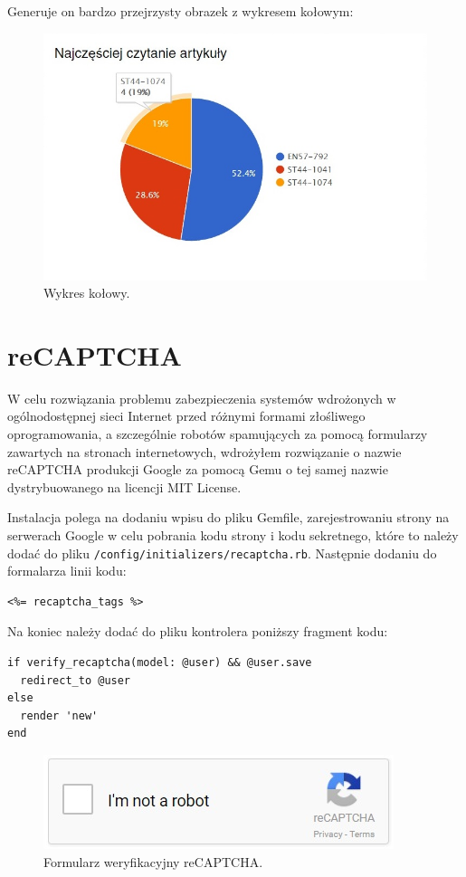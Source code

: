 \documentclass[openright]{xmgr}
\begin{document}
\newpage

Generuje on bardzo przejrzysty obrazek z wykresem kołowym:
\begin{figure}[!tbh]
\centering
\includegraphics[width=.5\linewidth]{fig/chartkick}
\caption{Wykres kołowy.}
\end{figure}

\section{reCAPTCHA}

W celu rozwiązania problemu zabezpieczenia systemów wdrożonych w ogólnodostępnej sieci Internet przed różnymi formami złośliwego oprogramowania, a szczególnie robotów spamujących za pomocą formularzy zawartych na stronach internetowych, wdrożyłem rozwiązanie o nazwie reCAPTCHA produkcji Google za pomocą Gemu o tej samej nazwie \cite{recaptcha} dystrybuowanego na licencji MIT License. 

\newpage

Instalacja polega na dodaniu wpisu do pliku Gemfile, zarejestrowaniu strony na serwerach Google w celu pobrania kodu strony i kodu sekretnego, które to należy dodać do pliku \texttt{/config/initializers/recaptcha.rb}. Następnie dodaniu do formalarza linii kodu:
\begin{lstlisting}[language=ruby2, caption={Kod wyświetlający formularz reCAPTCHA}]
<%= recaptcha_tags %> 
\end{lstlisting}
Na koniec należy dodać do pliku kontrolera poniższy fragment kodu: 
\begin{lstlisting}[language=ruby2, caption={Kod kontrolera weryfikujący reCAPTCHA}]
if verify_recaptcha(model: @user) && @user.save
  redirect_to @user
else
  render 'new'
end
\end{lstlisting}

\begin{figure}[!tbh]
\centering
\includegraphics[width=.6\linewidth]{fig/captcha}
\caption{Formularz weryfikacyjny reCAPTCHA.}
\end{figure}
\end{document}
